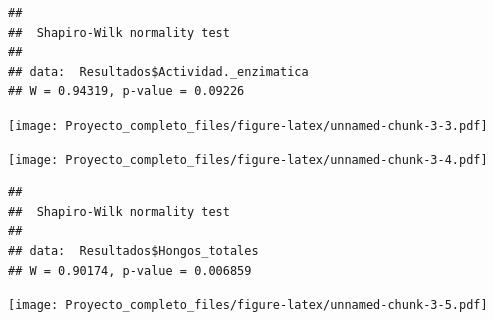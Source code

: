 \documentclass[
]{article}
\newenvironment{Shaded}{\begin{snugshade}}{\end{snugshade}}
\newcommand{\CommentTok}[1]{\textcolor[rgb]{0.56,0.35,0.01}{\textit{#1}}}
\newcommand{\FunctionTok}[1]{\textcolor[rgb]{0.13,0.29,0.53}{\textbf{#1}}}
\newcommand{\NormalTok}[1]{#1}
\newcommand{\SpecialCharTok}[1]{\textcolor[rgb]{0.81,0.36,0.00}{\textbf{#1}}}
\begin{document}
\begin{verbatim}
## 
##  Shapiro-Wilk normality test
## 
## data:  Resultados$Actividad._enzimatica
## W = 0.94319, p-value = 0.09226
\end{verbatim}

\begin{Shaded}
\end{Shaded}

\texttt{[image: Proyecto\_completo\_files/figure-latex/unnamed-chunk-3-3.pdf]}

\begin{Shaded}
\end{Shaded}

\texttt{[image: Proyecto\_completo\_files/figure-latex/unnamed-chunk-3-4.pdf]}

\begin{Shaded}
\end{Shaded}

\begin{verbatim}
## 
##  Shapiro-Wilk normality test
## 
## data:  Resultados$Hongos_totales
## W = 0.90174, p-value = 0.006859
\end{verbatim}

\begin{Shaded}
\end{Shaded}

\texttt{[image: Proyecto\_completo\_files/figure-latex/unnamed-chunk-3-5.pdf]}

\begin{Shaded}
\end{Shaded}
\end{document}
